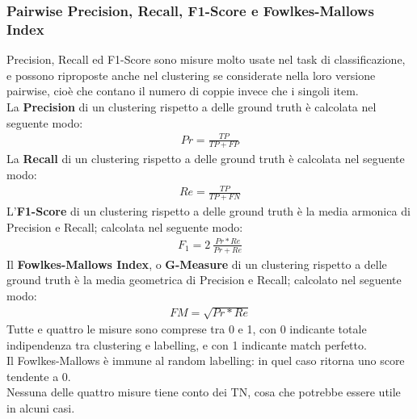 \subsubsection{Pairwise Precision, Recall, F1-Score e Fowlkes-Mallows Index}
Precision, Recall ed F1-Score sono misure molto usate nel task di classificazione, e possono riproposte anche nel clustering se considerate nella loro versione pairwise, cioè che contano il numero di coppie invece che i singoli item.\\
La \textbf{Precision} di un clustering rispetto a delle ground truth è calcolata nel seguente modo:
\begin{align}
Pr = \frac{TP}{TP + FP}
\end{align}
La \textbf{Recall} di un clustering rispetto a delle ground truth è calcolata nel seguente modo:
\begin{align}
Re = \frac{TP}{TP + FN}
\end{align}
L'\textbf{F1-Score} di un clustering rispetto a delle ground truth è la media armonica di Precision e Recall; calcolata nel seguente modo:
\begin{align}
F_1 = 2\:\frac{Pr * Re}{Pr + Re}
\end{align}
Il \textbf{Fowlkes-Mallows Index}, o \textbf{G-Measure} di un clustering rispetto a delle ground truth è la media geometrica di Precision e Recall; calcolato nel seguente modo:
\begin{align}
FM = \sqrt{Pr * Re}
\end{align}
Tutte e quattro le misure sono comprese tra 0 e 1, con 0 indicante totale indipendenza tra clustering e labelling, e con 1 indicante match perfetto.\\
Il Fowlkes-Mallows è immune al random labelling: in quel caso ritorna uno score tendente a 0.\\
Nessuna delle quattro misure tiene conto dei TN, cosa che potrebbe essere utile in alcuni casi.

